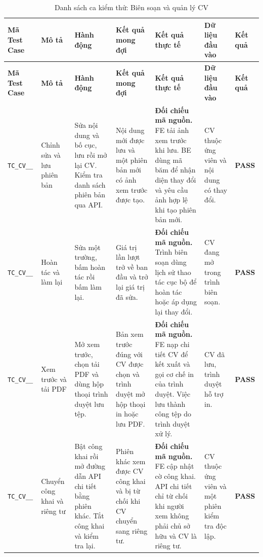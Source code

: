 \begin{landscape}
{
\fontsize{9.5}{11.5}\selectfont
\setlength{\tabcolsep}{3pt}
\renewcommand{\arraystretch}{1.2}
\begin{longtable}{|>{\raggedright\arraybackslash}p{2.1cm}|>{\raggedright\arraybackslash}p{2.8cm}|>{\raggedright\arraybackslash}p{3.8cm}|>{\raggedright\arraybackslash}p{4.0cm}|>{\raggedright\arraybackslash}p{5.0cm}|>{\raggedright\arraybackslash}p{3.2cm}|>{\centering\arraybackslash}p{1.3cm}|}
    \caption{Danh sách ca kiểm thử: Biên soạn và quản lý CV} \label{tab:ts-cv-02} \\
    \hline
    \textbf{Mã Test Case} & \textbf{Mô tả} & \textbf{Hành động} & \textbf{Kết quả mong đợi} & \textbf{Kết quả thực tế} & \textbf{Dữ liệu đầu vào} & \textbf{Kết quả} \\
    \hline
    \endfirsthead
    \hline
    \textbf{Mã Test Case} & \textbf{Mô tả} & \textbf{Hành động} & \textbf{Kết quả mong đợi} & \textbf{Kết quả thực tế} & \textbf{Dữ liệu đầu vào} & \textbf{Kết quả} \\
    \hline
    \endhead
    \hline
    \endfoot
    \hline
    \endlastfoot
    \texttt{TC\_\allowbreak CV\_\allowbreak 02\_\allowbreak 01} & Chỉnh sửa và lưu phiên bản & Sửa nội dung và bố cục, lưu rồi mở lại CV. Kiểm tra danh sách phiên bản qua API. & Nội dung mới được lưu và một phiên bản mới có ảnh xem trước được tạo. & \textbf{Đối chiếu mã nguồn.} FE tải ảnh xem trước khi lưu. BE dùng mã băm để nhận diện thay đổi và yêu cầu ảnh hợp lệ khi tạo phiên bản mới. & CV thuộc ứng viên và nội dung có thay đổi. & \textbf{PASS} \\
    \hline
    \texttt{TC\_\allowbreak CV\_\allowbreak 02\_\allowbreak 02} & Hoàn tác và làm lại & Sửa một trường, bấm hoàn tác rồi bấm làm lại. & Giá trị lần lượt trở về ban đầu và trở lại giá trị đã sửa. & \textbf{Đối chiếu mã nguồn.} Trình biên soạn dùng lịch sử thao tác cục bộ để hoàn tác hoặc áp dụng lại thay đổi. & CV đang mở trong trình biên soạn. & \textbf{PASS} \\
    \hline
    \texttt{TC\_\allowbreak CV\_\allowbreak 02\_\allowbreak 03} & Xem trước và tải PDF & Mở xem trước, chọn tải PDF và dùng hộp thoại trình duyệt lưu tệp. & Bản xem trước đúng với CV được chọn và trình duyệt mở hộp thoại in hoặc lưu PDF. & \textbf{Đối chiếu mã nguồn.} FE nạp chi tiết CV để kết xuất và gọi cơ chế in của trình duyệt. Việc lưu thành công tệp do trình duyệt xử lý. & CV đã lưu, trình duyệt hỗ trợ in. & \textbf{PASS} \\
    \hline
    \texttt{TC\_\allowbreak CV\_\allowbreak 02\_\allowbreak 04} & Chuyển công khai và riêng tư & Bật công khai rồi mở đường dẫn API chi tiết bằng phiên khác. Tắt công khai và kiểm tra lại. & Phiên khác xem được CV công khai và bị từ chối khi CV chuyển sang riêng tư. & \textbf{Đối chiếu mã nguồn.} FE cập nhật cờ công khai. API chi tiết chỉ từ chối khi người xem không phải chủ sở hữu và CV là riêng tư. & CV thuộc ứng viên và một phiên kiểm tra độc lập. & \textbf{PASS} \\

\end{longtable}}
\end{landscape}
